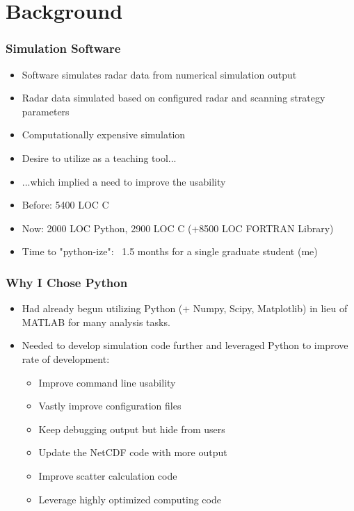 \documentclass[red, hyperref={pdfpagelabels=false}]{beamer}
\begin{document}
\section{Background}
\begin{frame}[<+->]
  \frametitle{Simulation Software}
  \begin{itemize}
    \item Software simulates radar data from numerical simulation output
    \item Radar data simulated based on configured radar and scanning strategy parameters
    \item Computationally expensive simulation
    \item Desire to utilize as a teaching tool...
    \item ...which implied a need to improve the usability
    \item Before: 5400 LOC C
    \item Now: 2000 LOC Python, 2900 LOC C (+8500 LOC FORTRAN Library)
    \item Time to "python-ize": ~1.5 months for a single graduate student (me)
  \end{itemize}
\end{frame}

\begin{frame}[<+->]
  \frametitle{Why I Chose Python}
  \begin{itemize}
    \item Had already begun utilizing Python (+ Numpy, Scipy, Matplotlib) in lieu of MATLAB
        for many analysis tasks.
    \item Needed to develop simulation code further and leveraged Python to improve rate of development:
    \begin{itemize}
      \item<3-> Improve command line usability 
      \item<3-> Vastly improve configuration files 
      \item<3-> Keep debugging output but hide from users 
      \item<3-> Update the NetCDF code with more output 
      \item<3-> Improve scatter calculation code 
      \item<3-> Leverage highly optimized computing code 
    \end{itemize}
  \end{itemize}
\end{frame}
\end{document}
